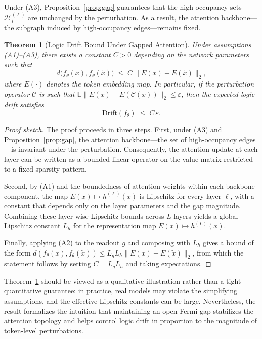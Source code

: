 \documentclass{article}
\newtheorem{theorem}{Theorem}
\begin{document}
Under (A3), Proposition~\ref{prop:gap} guarantees that the high-occupancy sets $\mathcal{H}_i^{(\ell)}$ are unchanged by the perturbation. As a result, the attention backbone---the subgraph induced by high-occupancy edges---remains fixed.

\begin{theorem}[Logic Drift Bound Under Gapped Attention]
\label{thm:drift-bound}
Under assumptions (A1)--(A3), there exists a constant $C > 0$ depending on the network parameters such that
\begin{equation}
    d\big(f_\theta(x), f_\theta(\tilde{x})\big)
    \;\le\;
    C \, \|E(x) - E(\tilde{x})\|_2,
\end{equation}
where $E(\cdot)$ denotes the token embedding map. In particular, if the perturbation operator $\mathcal{C}$ is such that
$\mathbb{E}\|E(x) - E(\mathcal{C}(x))\|_2 \le \varepsilon$,
then the expected logic drift satisfies
\begin{equation}
    \mathrm{Drift}(f_\theta)
    \;\le\;
    C \, \varepsilon.
\end{equation}
\end{theorem}

\begin{proof}[Proof sketch]
The proof proceeds in three steps. First, under (A3) and Proposition~\ref{prop:gap}, the attention backbone---the set of high-occupancy edges---is invariant under the perturbation. Consequently, the attention update at each layer can be written as a bounded linear operator on the value matrix restricted to a fixed sparsity pattern.

Second, by (A1) and the boundedness of attention weights within each backbone component, the map $E(x) \mapsto h^{(\ell)}(x)$ is Lipschitz for every layer $\ell$, with a constant that depends only on the layer parameters and the gap magnitude. Combining these layer-wise Lipschitz bounds across $L$ layers yields a global Lipschitz constant $L_h$ for the representation map $E(x) \mapsto h^{(L)}(x)$.

Finally, applying (A2) to the readout $g$ and composing with $L_h$ gives a bound of the form
$d(f_\theta(x), f_\theta(\tilde{x})) \le L_g L_h \|E(x) - E(\tilde{x})\|_2$,
from which the statement follows by setting $C = L_g L_h$ and taking expectations.
\end{proof}

Theorem~\ref{thm:drift-bound} should be viewed as a qualitative illustration rather than a tight quantitative guarantee: in practice, real models may violate the simplifying assumptions, and the effective Lipschitz constants can be large. Nevertheless, the result formalizes the intuition that maintaining an open Fermi gap stabilizes the attention topology and helps control logic drift in proportion to the magnitude of token-level perturbations.
\end{document}
